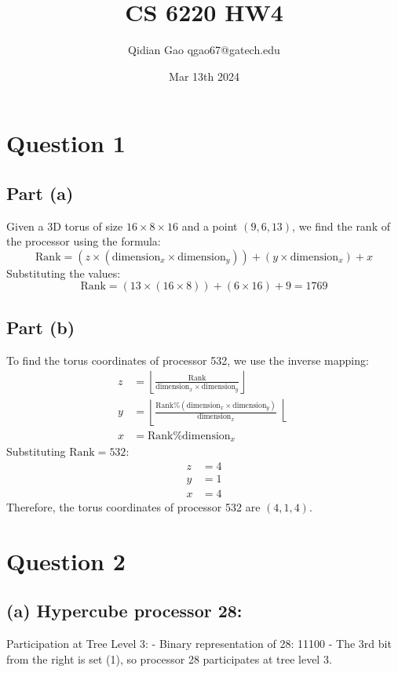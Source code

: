 \documentclass{article}
\title{CS 6220 HW4}
\author{Qidian Gao qgao67@gatech.edu}
\date{Mar 13th 2024}
\begin{document}
\maketitle
\section{Question 1}
\subsection*{Part (a)}
Given a 3D torus of size $16 \times 8 \times 16$ and a point $(9, 6, 13)$, we find the rank of the processor using the formula:
\[
\text{Rank} = (z \times (\text{dimension}_x \times \text{dimension}_y)) + (y \times \text{dimension}_x) + x
\]
Substituting the values:
\[
\text{Rank} = (13 \times (16 \times 8)) + (6 \times 16) + 9 = 1769
\]

\subsection*{Part (b)}
To find the torus coordinates of processor 532, we use the inverse mapping:
\begin{align*}
z &= \left\lfloor \frac{\text{Rank}}{\text{dimension}_x \times \text{dimension}_y} \right\rfloor \\
y &= \left\lfloor \frac{\text{Rank} \% (\text{dimension}_x \times \text{dimension}_y)}{\text{dimension}_x} \right\lfloor \\
x &= \text{Rank} \% \text{dimension}_x
\end{align*}
Substituting \(\text{Rank} = 532\):
\begin{align*}
z &= 4 \\
y &= 1 \\
x &= 4
\end{align*}
Therefore, the torus coordinates of processor 532 are $(4, 1, 4)$.

\section{Question 2}
\subsection{(a) Hypercube processor 28:}

Participation at Tree Level 3:
- Binary representation of 28: 11100
- The 3rd bit from the right is set (1), so processor 28 participates at tree level 3.
\end{document}

